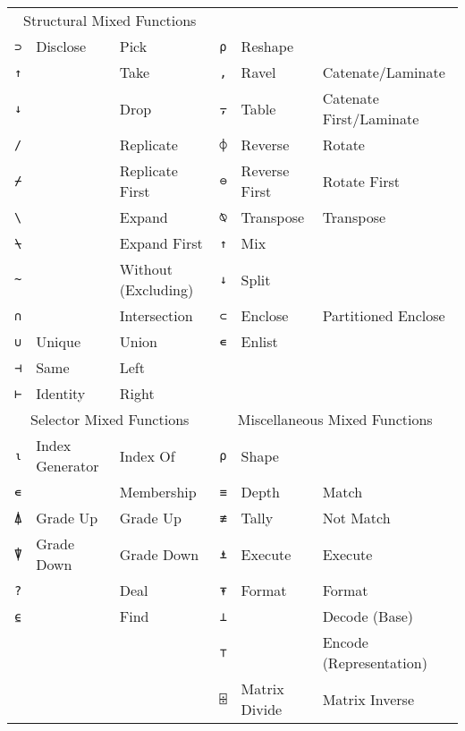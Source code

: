 \documentclass[numbers,10pt,preprint]{sigplanconf}
\begin{document}
\begin{center}
\begin{tabular}{cllcll}
\multicolumn{3}{c}{Structural Mixed Functions} \\
\cmidrule(r){1-3} \cmidrule(l){4-6}
\texttt{⊃}               & Disclose & Pick &
\texttt{⍴} & Reshape       & \\
\texttt{↑}               &          & Take &
\texttt{,} & Ravel         & Catenate/Laminate \\
\texttt{↓}               &          & Drop &
\texttt{⍪} & Table         & Catenate First/Laminate \\
\texttt{/}               &          & Replicate &
\texttt{⌽} & Reverse       & Rotate \\
\texttt{⌿}               &          & Replicate First &
\texttt{⊖} & Reverse First & Rotate First \\
\texttt{\textbackslash}  &          & Expand &
\texttt{⍉} & Transpose     & Transpose \\
\texttt{⍀}               &          & Expand First &
\texttt{↑} & Mix           & \\
\texttt{\textasciitilde} &          & Without (Excluding) &
\texttt{↓} & Split         & \\
\texttt{∩}               &          & Intersection &
\texttt{⊂} & Enclose       & Partitioned Enclose \\
\texttt{∪}               & Unique   & Union &
\texttt{∊} & Enlist        & \\
\texttt{⊣}               & Same     & Left \\
\texttt{⊢}               & Identity & Right\\
\midrule
\multicolumn{3}{c}{Selector Mixed Functions} &
\multicolumn{3}{c}{Miscellaneous Mixed Functions} \\
\cmidrule(r){1-3} \cmidrule(l){4-6}
\texttt{⍳} & Index Generator & Index Of &
\texttt{⍴} & Shape         & \\
\texttt{∊} &                 & Membership &
\texttt{≡} & Depth         & Match \\
\texttt{⍋} & Grade Up        & Grade Up &
\texttt{≢} & Tally         & Not Match \\
\texttt{⍒} & Grade Down      & Grade Down &
\texttt{⍎} & Execute       & Execute \\
\texttt{?} &                 & Deal &
\texttt{⍕} & Format        & Format \\
\texttt{⍷} &                 & Find &
\texttt{⊥} &               & Decode (Base) \\
& & & \texttt{⊤} &               & Encode (Representation) \\
& & & \texttt{⌹} & Matrix Divide & Matrix Inverse \\
\end{tabular}
\end{center}
\end{document}
